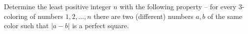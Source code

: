 Determine the least positive integer $n$ with the following property – for every 3-coloring of numbers $1,2,\ldots,n$ there are two (different) numbers $a,b$ of the same color such that $|a-b|$ is a perfect square.